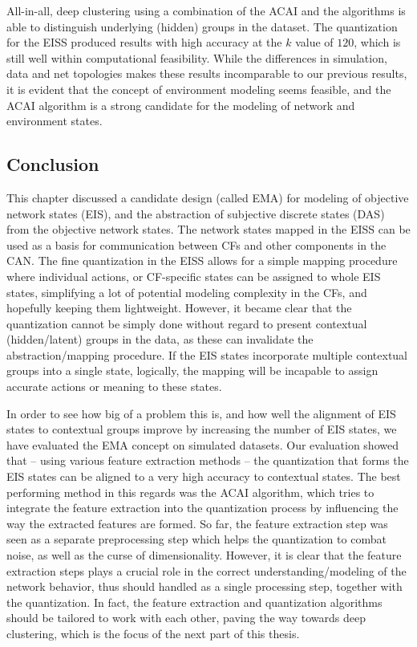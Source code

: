 			All-in-all, deep clustering using a combination of the \ac{ACAI} and the \kmeans{} algorithms is able to distinguish underlying (hidden) groups in the dataset.
			The quantization for the \ac{EISS} produced results with high accuracy at the $k$ value of $120$, which is still well within computational feasibility.
			While the differences in simulation, data and net topologies makes these results incomparable to our previous results, it is evident that the concept of environment modeling seems feasible, and the \ac{ACAI} algorithm is a strong candidate for the modeling of network and environment states.
		
		\subsection{Conclusion}

			This chapter discussed a candidate design (called \ac{EMA}) for modeling of objective network states (\ac{EIS}), and the abstraction of subjective discrete states (\ac{DAS}) from the objective network states.
			The network states mapped in the \ac{EISS} can be used as a basis for communication between \acp{CF} and other components in the \ac{CAN}.
			The fine quantization in the \ac{EISS} allows for a simple mapping procedure where individual actions, or \ac{CF}-specific states can be assigned to whole \ac{EIS} states, simplifying a lot of potential modeling complexity in the \acp{CF}, and hopefully keeping them lightweight.
			However, it became clear that the quantization cannot be simply done without regard to present contextual (hidden/latent) groups in the data, as these can invalidate the abstraction/mapping procedure.
			If the \ac{EIS} states incorporate multiple contextual groups into a single state, logically, the mapping will be incapable to assign accurate actions or meaning to these states.
			
			In order to see how big of a problem this is, and how well the alignment of \ac{EIS} states to contextual groups improve by increasing the number of \ac{EIS} states, we have evaluated the \ac{EMA} concept on simulated datasets.
			Our evaluation showed that -- using various feature extraction methods -- the quantization that forms the \ac{EIS} states can be aligned to a very high accuracy to contextual states.
			The best performing method in this regards was the \ac{ACAI} algorithm, which tries to integrate the feature extraction into the quantization process by influencing the way the extracted features are formed.
			So far, the feature extraction step was seen as a separate preprocessing step which helps the quantization to combat noise, as well as the curse of dimensionality.
			However, it is clear that the feature extraction steps plays a crucial role in the correct understanding/modeling of the network behavior, thus should handled as a single processing step, together with the quantization.
			In fact, the feature extraction and quantization algorithms should be tailored to work with each other, paving the way towards deep clustering, which is the focus of the next part of this thesis.
		
